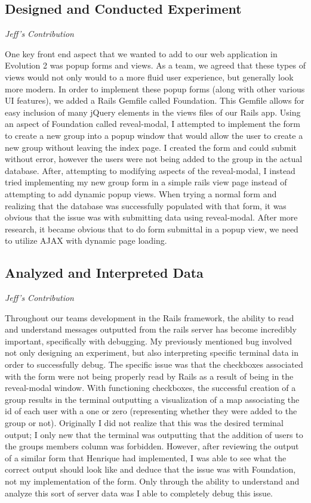 \documentclass[11pt]{article}
\begin{document}
\subsection{Designed and Conducted Experiment}

\textit{Jeff's Contribution}

One key front end aspect that we wanted to add to our web application in Evolution 2 was popup forms and views.  As a team, we agreed that these types of views would not only would to a more fluid user experience, but generally look more modern.  In order to implement these popup forms (along with other various UI features), we added a Rails Gemfile called Foundation.  This Gemfile allows for easy inclusion of many jQuery elements in the views files of our Rails app.  Using an aspect of Foundation called reveal-modal, I attempted to implement the form to create a new group into a popup window that would allow the user to create a new group without leaving the index page.  I created the form and could submit without error, however the users were not being added to the group in the actual database.  After, attempting to modifying aspects of the reveal-modal, I instead tried implementing my new group form in a simple rails view page instead of attempting to add dynamic popup views.  When trying a normal form and realizing that the database was successfully populated with that form, it was obvious that the issue was with submitting data using reveal-modal.  After more research, it became obvious that to do form submittal in a popup view, we need to utilize AJAX with dynamic page loading.

\subsection{Analyzed and Interpreted Data}

\textit{Jeff's Contribution}

Throughout our teams development in the Rails framework, the ability to read and understand messages outputted from the rails server has become incredibly important, specifically with debugging.  My previously mentioned bug involved not only designing an experiment, but also interpreting specific terminal data in order to successfully debug.  The specific issue was that the checkboxes associated with the form were not being properly read by Rails as a result of being in the reveal-modal window.  With functioning checkboxes, the successful creation of a group results in the terminal outputting a visualization of a map associating the id of each user with a one or zero (representing whether they were added to the group or not).  Originally I did not realize that this was the desired terminal output; I only new that the terminal was outputting that the addition of users to the groups members column was forbidden.  However, after reviewing the output of a similar form that Henrique had implemented, I was able to see what the correct output should look like and deduce that the issue was with Foundation, not my implementation of the form.  Only through the ability to understand and analyze this sort of server data was I able to completely debug this issue.
\end{document}
